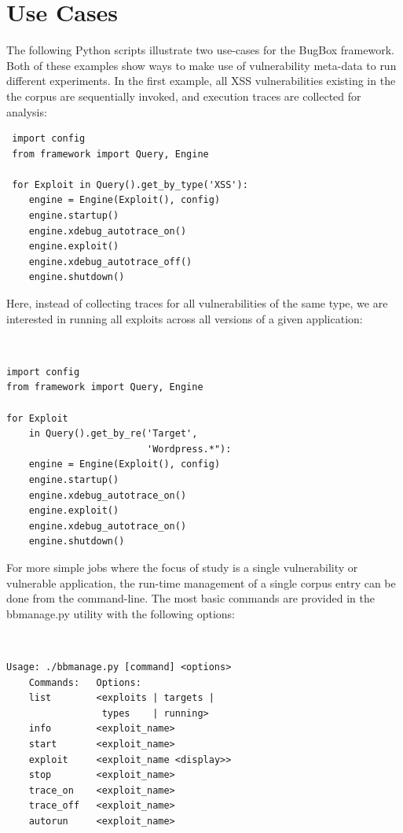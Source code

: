 \documentclass[letterpaper,twocolumn,10pt]{article}
\begin{document}
\section{Use Cases}

The following Python scripts illustrate two use-cases for the BugBox framework. Both of these examples show ways to make use of vulnerability meta-data to run different experiments. In the first example, all XSS vulnerabilities existing in the the corpus are sequentially invoked, and execution traces are collected for analysis:


\begin{minipage}{\textwidth}
{\tt \footnotesize

\begin{lstlisting}
 import config
 from framework import Query, Engine
 
 for Exploit in Query().get_by_type('XSS'):
    engine = Engine(Exploit(), config)
    engine.startup()
    engine.xdebug_autotrace_on()
    engine.exploit()
    engine.xdebug_autotrace_off()
    engine.shutdown()
\end{lstlisting}
}
\end{minipage}


Here, instead of collecting traces for all vulnerabilities of the same type, we are interested in running all exploits across all versions of a given application:

\begin{minipage}{\textwidth}
{\tt \footnotesize
\begin{lstlisting}
import config
from framework import Query, Engine

for Exploit 
    in Query().get_by_re('Target', 
                         'Wordpress.*"):
    engine = Engine(Exploit(), config)
    engine.startup()
    engine.xdebug_autotrace_on()
    engine.exploit()
    engine.xdebug_autotrace_on()
    engine.shutdown()
\end{lstlisting}
}
\end{minipage}

For more simple jobs where the focus of study is a single vulnerability or vulnerable application, the run-time management of a single corpus entry can be done from the command-line. The most basic commands are provided in the bbmanage.py utility with the following options:

{\tt \footnotesize
\begin{verbatim}
Usage: ./bbmanage.py [command] <options>
    Commands:   Options:
    list        <exploits | targets | 
                 types    | running>
    info        <exploit_name>
    start       <exploit_name>
    exploit     <exploit_name <display>>
    stop        <exploit_name>
    trace_on    <exploit_name>
    trace_off   <exploit_name>
    autorun     <exploit_name>
\end{verbatim}
}
\end{document}
